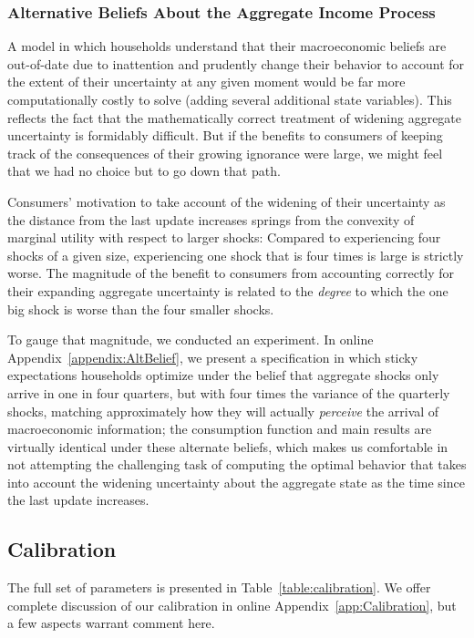 \documentclass[titlepage]{./econtex}
\begin{document}
\hypertarget{AltBeliefs}{}
\subsubsection{Alternative Beliefs About the Aggregate Income Process}
A model in which households understand that their macroeconomic beliefs are out-of-date due to inattention and prudently change their behavior to account for the extent of their uncertainty at any given moment would be far more computationally costly to solve (adding several additional state variables).  This reflects the fact that the mathematically correct treatment of widening aggregate uncertainty is formidably difficult.  But if the benefits to consumers of keeping track of the consequences of their growing ignorance were large, we might feel that we had no choice but to go down that path.

Consumers' motivation to take account of the widening of their uncertainty as the distance from the last update increases springs from the convexity of marginal utility with respect to larger shocks: Compared to experiencing four shocks of a given size, experiencing one shock that is four times is large is strictly worse.  The magnitude of the benefit to consumers from accounting correctly for their expanding aggregate uncertainty is related to the \textit{degree} to which the one big shock is worse than the four smaller shocks.

To gauge that magnitude, we conducted an experiment.  In online Appendix~\ref{appendix:AltBelief}, we present a specification in which sticky expectations households optimize under the belief that aggregate shocks only arrive in one in four quarters, but with four times the variance of the quarterly shocks, matching approximately how they will actually \textit{perceive} the arrival of macroeconomic information; the consumption function and main results are virtually identical under these alternate beliefs, which makes us comfortable in not attempting the challenging task of computing the optimal behavior that takes into account the widening uncertainty about the aggregate state as the time since the last update increases.

\subsection{Calibration}\label{sec:calibration}

The full set of parameters is presented in Table~\ref{table:calibration}.  We offer complete discussion of our calibration in online Appendix~\ref{app:Calibration}, but a few aspects warrant comment here.
\end{document}
